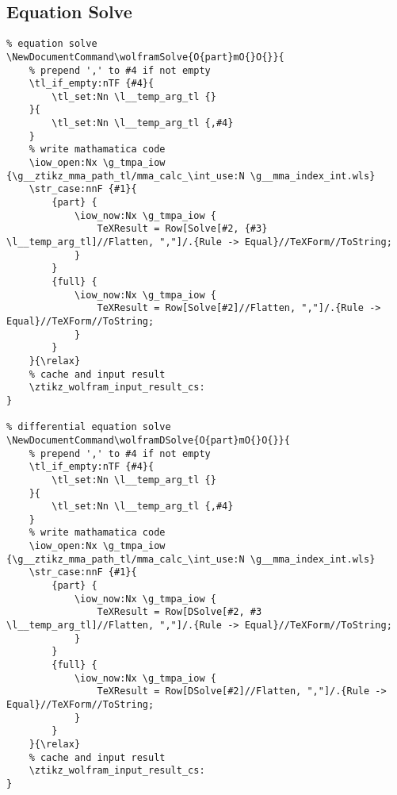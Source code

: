 \subsection{Equation Solve}
\begin{verbatim}
% equation solve
\NewDocumentCommand\wolframSolve{O{part}mO{}O{}}{
    % prepend ',' to #4 if not empty
    \tl_if_empty:nTF {#4}{
        \tl_set:Nn \l__temp_arg_tl {}
    }{
        \tl_set:Nn \l__temp_arg_tl {,#4} 
    }
    % write mathamatica code
    \iow_open:Nx \g_tmpa_iow {\g__ztikz_mma_path_tl/mma_calc_\int_use:N \g__mma_index_int.wls}
    \str_case:nnF {#1}{
        {part} {
            \iow_now:Nx \g_tmpa_iow {
                TeXResult = Row[Solve[#2, {#3} \l__temp_arg_tl]//Flatten, ","]/.{Rule -> Equal}//TeXForm//ToString;
            }
        }
        {full} {
            \iow_now:Nx \g_tmpa_iow {
                TeXResult = Row[Solve[#2]//Flatten, ","]/.{Rule -> Equal}//TeXForm//ToString;
            }
        }
    }{\relax}
    % cache and input result
    \ztikz_wolfram_input_result_cs:
}

% differential equation solve
\NewDocumentCommand\wolframDSolve{O{part}mO{}O{}}{
    % prepend ',' to #4 if not empty
    \tl_if_empty:nTF {#4}{
        \tl_set:Nn \l__temp_arg_tl {}
    }{
        \tl_set:Nn \l__temp_arg_tl {,#4} 
    }
    % write mathamatica code
    \iow_open:Nx \g_tmpa_iow {\g__ztikz_mma_path_tl/mma_calc_\int_use:N \g__mma_index_int.wls}
    \str_case:nnF {#1}{
        {part} {
            \iow_now:Nx \g_tmpa_iow {
                TeXResult = Row[DSolve[#2, #3 \l__temp_arg_tl]//Flatten, ","]/.{Rule -> Equal}//TeXForm//ToString;
            }
        }
        {full} {
            \iow_now:Nx \g_tmpa_iow {
                TeXResult = Row[DSolve[#2]//Flatten, ","]/.{Rule -> Equal}//TeXForm//ToString;
            }
        }
    }{\relax}
    % cache and input result
    \ztikz_wolfram_input_result_cs:
}
\end{verbatim}
